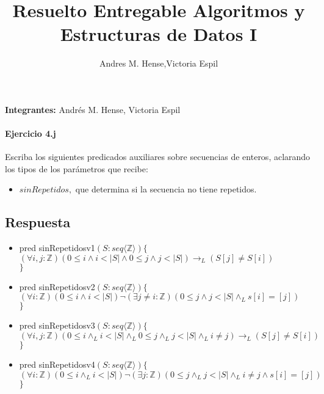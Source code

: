 \documentclass[a4paper]{article}
\title{Resuelto Entregable Algoritmos y Estructuras de Datos I}
\author{Andres M. Hense,Victoria Espil}
\date{} %
\begin{document}




\begin{center}
\textbf{Integrantes:} Andrés M. Hense, Victoria Espil
\end{center}

\paragraph{Ejercicio 4.j} Escriba los siguientes predicados auxiliares sobre secuencias de enteros, aclarando los tipos de los parámetros que recibe:

\begin{itemize}
	\item $sinRepetidos,$ que determina si la secuencia no tiene repetidos.
\end{itemize}

\subsection*{Respuesta}

\begin{itemize}
	\item pred sinRepetidosv1$(S: seq\langle \mathbb{Z} \rangle)\{$\\
\hspace*{6mm}$(\forall i,j:\mathbb{Z})(0\leq i\wedge i<\vert S\vert \wedge 0\leq j\wedge j<\vert S\vert)\rightarrow_L (S[j] \neq S[i])$\\
$\}$
	\item pred sinRepetidosv2$(S: seq\langle \mathbb{Z} \rangle)\{$\\
\hspace*{6mm}$(\forall i:\mathbb{Z})(0\leq i\wedge i<\vert S\vert)\neg(\exists j\neq i:\mathbb{Z})
 (0\leq j\wedge j<\vert S\vert \wedge_L s[i]=[j])$\\
$\}$
	\item pred sinRepetidosv3$(S: seq\langle \mathbb{Z} \rangle)\{$\\
\hspace*{6mm}$(\forall i,j:\mathbb{Z})(0\leq i\wedge_L i<\vert S\vert \wedge_L 0\leq j\wedge_L
 j<\vert S\vert\wedge_L i\neq j)\rightarrow_L (S[j] \neq S[i])$\\
$\}$
	\item pred sinRepetidosv4$(S: seq\langle \mathbb{Z} \rangle)\{$\\
\hspace*{6mm}$(\forall i:\mathbb{Z})(0\leq i\wedge_L i<\vert S\vert)\neg(\exists j:\mathbb{Z})
 (0\leq j\wedge_L j<\vert S\vert \wedge_L i\neq j\wedge s[i]=[j])$\\
$\}$
\end{itemize}
\end{document}
